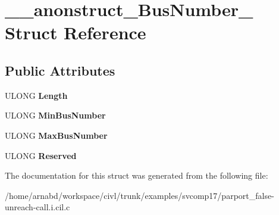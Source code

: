 \hypertarget{struct____anonstruct__BusNumber__31}{}\section{\+\_\+\+\_\+anonstruct\+\_\+\+Bus\+Number\+\_ Struct Reference}
\label{struct____anonstruct__BusNumber__31}
\subsection*{Public Attributes}
\begin{DoxyCompactItemize}
\item 
\hypertarget{struct____anonstruct__BusNumber__31_a2f90618f38b9e5b0d8cfd86d24962c31}{}U\+L\+O\+N\+G {\bfseries Length}\label{struct____anonstruct__BusNumber__31_a2f90618f38b9e5b0d8cfd86d24962c31}

\item 
\hypertarget{struct____anonstruct__BusNumber__31_ac14b558b6bf28bf4a3ddc39903ef548f}{}U\+L\+O\+N\+G {\bfseries Min\+Bus\+Number}\label{struct____anonstruct__BusNumber__31_ac14b558b6bf28bf4a3ddc39903ef548f}

\item 
\hypertarget{struct____anonstruct__BusNumber__31_a4edbf32d97033b08535c569163f527ec}{}U\+L\+O\+N\+G {\bfseries Max\+Bus\+Number}\label{struct____anonstruct__BusNumber__31_a4edbf32d97033b08535c569163f527ec}

\item 
\hypertarget{struct____anonstruct__BusNumber__31_a9fc38bb8d9d7e6635f4cc53b16dcd0a3}{}U\+L\+O\+N\+G {\bfseries Reserved}\label{struct____anonstruct__BusNumber__31_a9fc38bb8d9d7e6635f4cc53b16dcd0a3}

\end{DoxyCompactItemize}


The documentation for this struct was generated from the following file\+:\begin{DoxyCompactItemize}
\item 
/home/arnabd/workspace/civl/trunk/examples/svcomp17/parport\+\_\+false-\/unreach-\/call.\+i.\+cil.\+c\end{DoxyCompactItemize}
